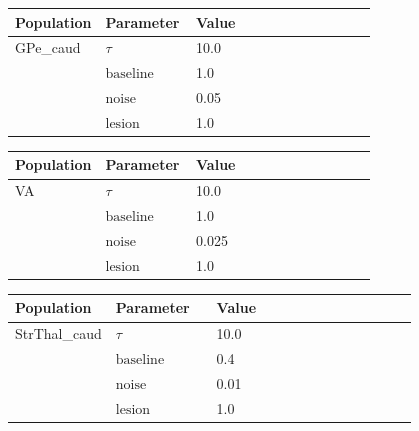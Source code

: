 \documentclass{article}
\begin{document}
\vspace{2ex}

\noindent
\begin{tabularx}{\linewidth}{|p{0.25\linewidth}|p{0.25\linewidth}|X|}\hline
\textbf{Population} & \textbf{Parameter} & \textbf{Value}   \\ \hline

    GPe\_caud             & $\tau$        & 10.0  \\ \hline

                 & ${\text{baseline}}$        & 1.0  \\ \hline

                 & ${\text{noise}}$        & 0.05  \\ \hline

                 & ${\text{lesion}}$        & 1.0  \\ \hline

\end{tabularx}

\vspace{2ex}

\noindent
\begin{tabularx}{\linewidth}{|p{0.25\linewidth}|p{0.25\linewidth}|X|}\hline
\textbf{Population} & \textbf{Parameter} & \textbf{Value}   \\ \hline

    VA             & $\tau$        & 10.0  \\ \hline

                 & ${\text{baseline}}$        & 1.0  \\ \hline

                 & ${\text{noise}}$        & 0.025  \\ \hline

                 & ${\text{lesion}}$        & 1.0  \\ \hline

\end{tabularx}

\vspace{2ex}

\noindent
\begin{tabularx}{\linewidth}{|p{0.25\linewidth}|p{0.25\linewidth}|X|}\hline
\textbf{Population} & \textbf{Parameter} & \textbf{Value}   \\ \hline

    StrThal\_caud             & $\tau$        & 10.0  \\ \hline

                 & ${\text{baseline}}$        & 0.4  \\ \hline

                 & ${\text{noise}}$        & 0.01  \\ \hline

                 & ${\text{lesion}}$        & 1.0  \\ \hline

\end{tabularx}
\end{document}
